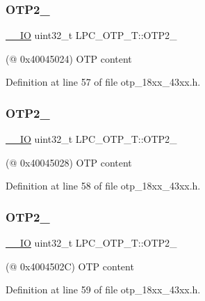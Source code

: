 \subsubsection{\texorpdfstring{O\+T\+P2\+\_}{OTP2\_1}}
{\footnotesize\ttfamily \hyperlink{core__sc300_8h_aec43007d9998a0a0e01faede4133d6be}{\+\_\+\+\_\+\+IO} uint32\+\_\+t L\+P\+C\+\_\+\+O\+T\+P\+\_\+\+T\+::\+O\+T\+P2\+\_}

(@ 0x40045024) O\+TP content 

Definition at line 57 of file otp\+\_\+18xx\+\_\+43xx.\+h.

\mbox{\label{struct_l_p_c___o_t_p___t_aac5c0998bc11d126e38bdfd5cafbae8f}} 
\subsubsection{\texorpdfstring{O\+T\+P2\+\_}{OTP2\_2}}
{\footnotesize\ttfamily \hyperlink{core__sc300_8h_aec43007d9998a0a0e01faede4133d6be}{\+\_\+\+\_\+\+IO} uint32\+\_\+t L\+P\+C\+\_\+\+O\+T\+P\+\_\+\+T\+::\+O\+T\+P2\+\_}

(@ 0x40045028) O\+TP content 

Definition at line 58 of file otp\+\_\+18xx\+\_\+43xx.\+h.

\mbox{\label{struct_l_p_c___o_t_p___t_ae45317b08e121d537a979c4f841cc113}} 
\subsubsection{\texorpdfstring{O\+T\+P2\+\_}{OTP2\_3}}
{\footnotesize\ttfamily \hyperlink{core__sc300_8h_aec43007d9998a0a0e01faede4133d6be}{\+\_\+\+\_\+\+IO} uint32\+\_\+t L\+P\+C\+\_\+\+O\+T\+P\+\_\+\+T\+::\+O\+T\+P2\+\_}

(@ 0x4004502C) O\+TP content 

Definition at line 59 of file otp\+\_\+18xx\+\_\+43xx.\+h.

\mbox{\label{struct_l_p_c___o_t_p___t_afbb408a110067bb390d71718391d27eb}} 
